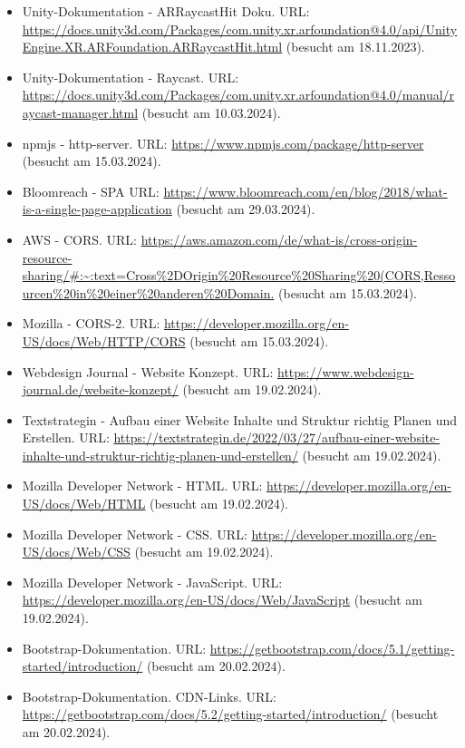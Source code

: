 \begin{itemize}[leftmargin=0pt]
    \item Unity-Dokumentation - ARRaycastHit Doku. {\scriptsize URL:}  \url{https://docs.unity3d.com/Packages/com.unity.xr.arfoundation@4.0/api/UnityEngine.XR.ARFoundation.ARRaycastHit.html} (besucht am 18.11.2023).
    \item Unity-Dokumentation - Raycast. {\scriptsize URL:} \url{https://docs.unity3d.com/Packages/com.unity.xr.arfoundation@4.0/manual/raycast-manager.html} (besucht am 10.03.2024).
    \item npmjs - http-server. {\scriptsize URL:} \url{https://www.npmjs.com/package/http-server} (besucht am 15.03.2024).
    \item Bloomreach - SPA {\scriptsize URL:} \url{https://www.bloomreach.com/en/blog/2018/what-is-a-single-page-application} (besucht am 29.03.2024).
    \item AWS - CORS. {\scriptsize URL:} \url{https://aws.amazon.com/de/what-is/cross-origin-resource-sharing/#:~:text=Cross%2DOrigin%20Resource%20Sharing%20(CORS,Ressourcen%20in%20einer%20anderen%20Domain.} (besucht am 15.03.2024).
    \item Mozilla - CORS-2. {\scriptsize URL:} \url{https://developer.mozilla.org/en-US/docs/Web/HTTP/CORS} (besucht am 15.03.2024).
    \item Webdesign Journal - Website Konzept. {\scriptsize URL:} \url{https://www.webdesign-journal.de/website-konzept/} (besucht am 19.02.2024).
    \item Textstrategin - Aufbau einer Website Inhalte und Struktur richtig Planen und Erstellen. {\scriptsize URL:} \url{https://textstrategin.de/2022/03/27/aufbau-einer-website-inhalte-und-struktur-richtig-planen-und-erstellen/} (besucht am 19.02.2024).
    \item Mozilla Developer Network - HTML. {\scriptsize URL:} \url{https://developer.mozilla.org/en-US/docs/Web/HTML} (besucht am 19.02.2024).
    \item Mozilla Developer Network - CSS. {\scriptsize URL:} \url{https://developer.mozilla.org/en-US/docs/Web/CSS} (besucht am 19.02.2024).
    \item Mozilla Developer Network - JavaScript. {\scriptsize URL:} \url{https://developer.mozilla.org/en-US/docs/Web/JavaScript} (besucht am 19.02.2024).
    \item Bootstrap-Dokumentation. {\scriptsize URL:} \url{https://getbootstrap.com/docs/5.1/getting-started/introduction/} (besucht am 20.02.2024).
    \item Bootstrap-Dokumentation. CDN-Links. {\scriptsize URL:} \url{https://getbootstrap.com/docs/5.2/getting-started/introduction/} (besucht am 20.02.2024).

\end{itemize}
